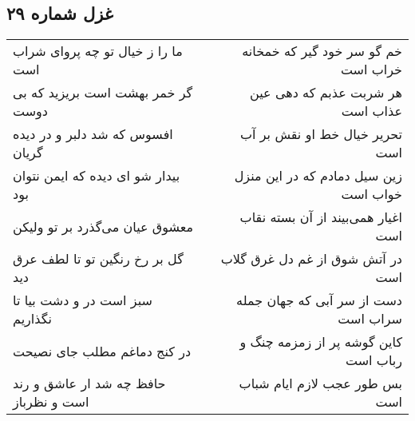 \begin{center}
\section*{غزل شماره ۲۹}
\label{sec:sh029}
\begin{longtable}{l p{0.5cm} r}
ما را ز خیال تو چه پروای شراب است
&&
خم گو سر خود گیر که خمخانه خراب است
\\
گر خمر بهشت است بریزید که بی دوست
&&
هر شربت عذبم که دهی عین عذاب است
\\
افسوس که شد دلبر و در دیده گریان
&&
تحریر خیال خط او نقش بر آب است
\\
بیدار شو ای دیده که ایمن نتوان بود
&&
زین سیل دمادم که در این منزل خواب است
\\
معشوق عیان می‌گذرد بر تو ولیکن
&&
اغیار همی‌بیند از آن بسته نقاب است
\\
گل بر رخ رنگین تو تا لطف عرق دید
&&
در آتش شوق از غم دل غرق گلاب است
\\
سبز است در و دشت بیا تا نگذاریم
&&
دست از سر آبی که جهان جمله سراب است
\\
در کنج دماغم مطلب جای نصیحت
&&
کاین گوشه پر از زمزمه چنگ و رباب است
\\
حافظ چه شد ار عاشق و رند است و نظرباز
&&
بس طور عجب لازم ایام شباب است
\\
\end{longtable}
\end{center}
